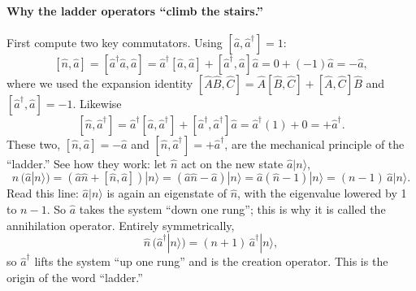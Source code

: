 \paragraph{Why the ladder operators ``climb the stairs.''}
First compute two key commutators. Using \([\hat a,\hat a^\dagger]=1\):
\[
  [\hat n,\hat a]=[\hat a^\dagger\hat a,\hat a]
  =\hat a^\dagger[\hat a,\hat a]+[\hat a^\dagger,\hat a]\hat a
  =0+(-1)\hat a=-\hat a,
\]
where we used the expansion identity \([\hat A\hat B,\hat C]=\hat A[\hat B,\hat C]+[\hat A,\hat C]\hat B\) and \([\hat a^\dagger,\hat a]=-1\). Likewise
\[
  [\hat n,\hat a^\dagger]=\hat a^\dagger[\hat a,\hat a^\dagger]+[\hat a^\dagger,\hat a^\dagger]\hat a
  =\hat a^\dagger(1)+0=+\hat a^\dagger .
\]
These two, \([\hat n,\hat a]=-\hat a\) and \([\hat n,\hat a^\dagger]=+\hat a^\dagger\), are the mechanical principle of the ``ladder.'' See how they work: let \(\hat n\) act on the new state \(\hat a|n\rangle\),
\[
  \hat n\,(\hat a|n\rangle)
  =(\hat a\hat n+[\hat n,\hat a])|n\rangle
  =(\hat a\hat n-\hat a)|n\rangle
  =\hat a(\hat n-1)|n\rangle
  =(n-1)\,\hat a|n\rangle .
\]
Read this line: \(\hat a|n\rangle\) is again an eigenstate of \(\hat n\), with the eigenvalue lowered by 1 to \(n-1\). So \(\hat a\) takes the system ``down one rung''; this is why it is called the annihilation operator. Entirely symmetrically,
\[
  \hat n\,(\hat a^\dagger|n\rangle)=(n+1)\,\hat a^\dagger|n\rangle,
\]
so \(\hat a^\dagger\) lifts the system ``up one rung'' and is the creation operator. This is the origin of the word ``ladder.''

